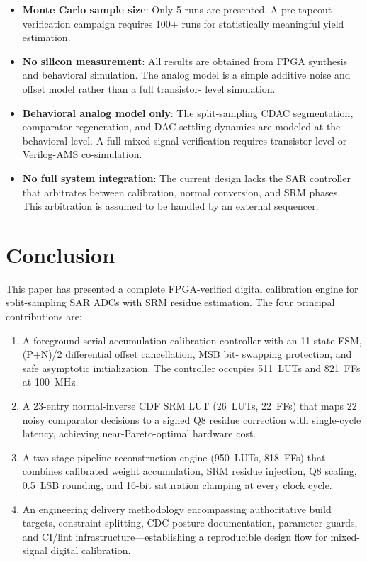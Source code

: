 \documentclass[journal]{IEEEtran}
\begin{document}
\begin{itemize}
    \item \textbf{Monte Carlo sample size}: Only 5 runs are presented. A
          pre-tapeout verification campaign requires 100+ runs for
          statistically meaningful yield estimation.
    \item \textbf{No silicon measurement}: All results are obtained from
          FPGA synthesis and behavioral simulation. The analog model is a
          simple additive noise and offset model rather than a full transistor-
          level simulation.
    \item \textbf{Behavioral analog model only}: The split-sampling CDAC
          segmentation, comparator regeneration, and DAC settling dynamics
          are modeled at the behavioral level. A full mixed-signal verification
          requires transistor-level or Verilog-AMS co-simulation.
    \item \textbf{No full system integration}: The current design lacks the
          SAR controller that arbitrates between calibration, normal conversion,
          and SRM phases. This arbitration is assumed to be handled by an
          external sequencer.
\end{itemize}

\section{Conclusion}
\label{sec:conclusion}

This paper has presented a complete FPGA-verified digital calibration engine
for split-sampling SAR ADCs with SRM residue estimation. The four principal
contributions are:

\begin{enumerate}
    \item A foreground serial-accumulation calibration controller with an
          11-state FSM, (P+N)/2 differential offset cancellation, MSB bit-
          swapping protection, and safe asymptotic initialization. The
          controller occupies 511~LUTs and 821~FFs at 100~MHz.
    \item A 23-entry normal-inverse CDF SRM LUT (26~LUTs, 22~FFs) that maps
          22 noisy comparator decisions to a signed Q8 residue correction
          with single-cycle latency, achieving near-Pareto-optimal hardware
          cost.
    \item A two-stage pipeline reconstruction engine (950~LUTs, 818~FFs) that
          combines calibrated weight accumulation, SRM residue injection,
          Q8 scaling, 0.5~LSB rounding, and 16-bit saturation clamping at
          every clock cycle.
    \item An engineering delivery methodology encompassing authoritative build
          targets, constraint splitting, CDC posture documentation, parameter
          guards, and CI/lint infrastructure---establishing a reproducible
          design flow for mixed-signal digital calibration.
\end{enumerate}
\end{document}
